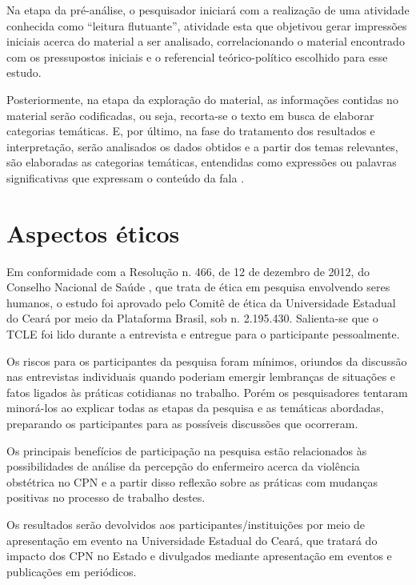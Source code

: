 Na etapa da pré-análise, o pesquisador iniciará com a realização de uma atividade conhecida como ``leitura flutuante'', atividade esta que objetivou gerar impressões iniciais acerca do material a ser analisado, correlacionando o material encontrado com os pressupostos iniciais e o referencial teórico-político escolhido para esse estudo. 

Posteriormente, na etapa da exploração do material, as informações contidas no material serão codificadas, ou seja, recorta-se o texto em busca de elaborar categorias temáticas. E, por último, na fase do tratamento dos resultados e interpretação, serão analisados os dados obtidos e a partir dos temas relevantes, são elaboradas as categorias temáticas, entendidas como expressões ou palavras significativas que expressam o conteúdo da fala \cite{minayo1989desafio}.

\section{Aspectos éticos}

Em conformidade com a Resolução n. 466, de 12 de dezembro de 2012, do Conselho Nacional de Saúde \cite{brazil2011portaria}, que trata de ética em pesquisa envolvendo seres humanos, o estudo foi aprovado pelo Comitê de ética da Universidade Estadual do Ceará por meio da Plataforma Brasil, sob n. 2.195.430. Salienta-se que o \acrshort{TCLE} foi lido durante a entrevista e entregue para o participante pessoalmente.

Os riscos para os participantes da pesquisa foram mínimos, oriundos da discussão nas entrevistas individuais quando poderiam emergir lembranças de situações e fatos ligados às práticas cotidianas no trabalho. Porém os pesquisadores tentaram minorá-los ao explicar todas as etapas da pesquisa e as temáticas abordadas, preparando os participantes para as possíveis discussões que ocorreram. 

Os principais benefícios de participação na pesquisa estão relacionados às possibilidades de análise da percepção do enfermeiro acerca da violência obstétrica no CPN e a partir disso reflexão sobre as práticas com mudanças positivas no processo de trabalho destes. 

Os resultados serão devolvidos aos participantes/instituições por meio de apresentação em evento na Universidade Estadual do Ceará, que tratará do impacto dos CPN no Estado e divulgados mediante apresentação em eventos e publicações em periódicos.
